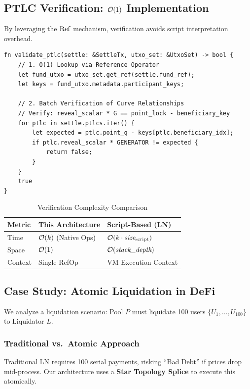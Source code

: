 \subsection{PTLC Verification: $\mathcal{O}(1)$ Implementation}

By leveraging the $\operatorname{Ref}$ mechanism, verification avoids script interpretation overhead.

\begin{lstlisting}[caption={Constant-Time PTLC Verification Logic}, label={lst:ptlc_verify}]
fn validate_ptlc(settle: &SettleTx, utxo_set: &UtxoSet) -> bool {
    // 1. O(1) Lookup via Reference Operator
    let fund_utxo = utxo_set.get_ref(settle.fund_ref);
    let keys = fund_utxo.metadata.participant_keys;
    
    // 2. Batch Verification of Curve Relationships
    // Verify: reveal_scalar * G == point_lock - beneficiary_key
    for ptlc in settle.ptlcs.iter() {
        let expected = ptlc.point_q - keys[ptlc.beneficiary_idx];
        if ptlc.reveal_scalar * GENERATOR != expected {
            return false;
        }
    }
    true
}
\end{lstlisting}

\begin{table}[htbp]
\centering
\caption{Verification Complexity Comparison}
\label{tab:complexity}
\small
\begin{tabular}{@{}lll@{}}
\toprule
\textbf{Metric} & \textbf{This Architecture} & \textbf{Script-Based (LN)} \\
\midrule
Time & $\mathcal{O}(k)$ (Native Ops) & $\mathcal{O}(k \cdot \textit{size}_{\text{script}})$ \\
Space & $\mathcal{O}(1)$ & $\mathcal{O}(\textit{stack\_depth})$ \\
Context & Single RefOp & VM Execution Context \\
\bottomrule
\end{tabular}
\end{table}

\subsection{Case Study: Atomic Liquidation in DeFi}

We analyze a liquidation scenario: Pool $P$ must liquidate 100 users $\{U_1, \dots, U_{100}\}$ to Liquidator $L$.

\subsubsection{Traditional vs.\ Atomic Approach}
Traditional LN requires 100 serial payments, risking ``Bad Debt'' if prices drop mid-process. Our architecture uses a \textbf{Star Topology Splice} to execute this atomically.

